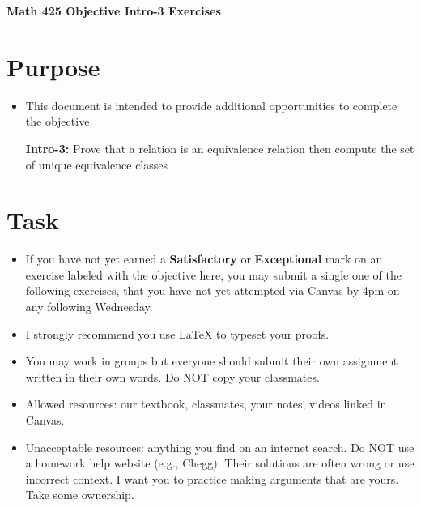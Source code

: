 \documentclass[12pt]{article}
\begin{document}
	\begin{center}
		{\Large \bf Math 425 Objective Intro-3 Exercises}
	\end{center}
	\section*{Purpose}
	\begin{itemize}
		\item This document is intended to provide additional opportunities to complete the objective
		
		\textbf{Intro-3:} Prove that a relation is an equivalence relation then compute the set of unique equivalence classes
	\end{itemize}
	\section*{Task}
	\begin{itemize}
		\item If you have not yet earned a \textbf{Satisfactory} or \textbf{Exceptional} mark on an exercise labeled with the objective here, you may submit a single one of the following exercises, that you have not yet attempted via Canvas by 4pm on any following Wednesday.
		\item I strongly recommend you use LaTeX to typeset your proofs.
		\item You may work in groups but everyone should submit their own assignment written in their own words.  Do NOT copy your classmates.
		\item Allowed resources: our textbook, classmates, your notes, videos linked in Canvas.
		\item Unacceptable resources: anything you find on an internet search. Do NOT use a homework help website (e.g., Chegg). Their solutions are often wrong or use incorrect context.  I want you to practice making arguments that are yours. Take some ownership.
	\end{itemize}
\end{document}
